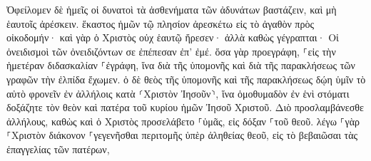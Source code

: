 \documentclass{openreader}
\begin{document}
Ὀφείλομεν δὲ ἡμεῖς οἱ δυνατοὶ τὰ ἀσθενήματα τῶν ἀδυνάτων βαστάζειν, καὶ μὴ ἑαυτοῖς ἀρέσκειν. 
ἕκαστος ἡμῶν τῷ πλησίον ἀρεσκέτω εἰς τὸ ἀγαθὸν πρὸς οἰκοδομήν· 
καὶ γὰρ ὁ Χριστὸς οὐχ ἑαυτῷ ἤρεσεν· ἀλλὰ καθὼς γέγραπται· Οἱ ὀνειδισμοὶ τῶν ὀνειδιζόντων σε ἐπέπεσαν ἐπ’ ἐμέ. 
ὅσα γὰρ προεγράφη, ⸀εἰς τὴν ἡμετέραν διδασκαλίαν ⸀ἐγράφη, ἵνα διὰ τῆς ὑπομονῆς καὶ διὰ τῆς παρακλήσεως τῶν γραφῶν τὴν ἐλπίδα ἔχωμεν. 
ὁ δὲ θεὸς τῆς ὑπομονῆς καὶ τῆς παρακλήσεως δῴη ὑμῖν τὸ αὐτὸ φρονεῖν ἐν ἀλλήλοις κατὰ ⸂Χριστὸν Ἰησοῦν⸃, 
ἵνα ὁμοθυμαδὸν ἐν ἑνὶ στόματι δοξάζητε τὸν θεὸν καὶ πατέρα τοῦ κυρίου ἡμῶν Ἰησοῦ Χριστοῦ. 
Διὸ προσλαμβάνεσθε ἀλλήλους, καθὼς καὶ ὁ Χριστὸς προσελάβετο ⸀ὑμᾶς, εἰς δόξαν ⸀τοῦ θεοῦ. 
λέγω ⸀γὰρ ⸀Χριστὸν διάκονον ⸀γεγενῆσθαι περιτομῆς ὑπὲρ ἀληθείας θεοῦ, εἰς τὸ βεβαιῶσαι τὰς ἐπαγγελίας τῶν πατέρων, 
\end{document}
